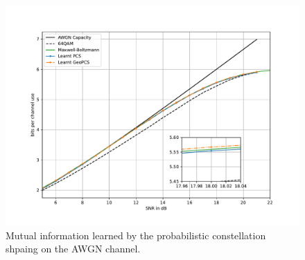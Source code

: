 \begin{figure}[h]
	\includegraphics[width=\columnwidth]{figs/aref_gcs.pdf}
	\caption{Mutual information learned by the probabilistic constellation shpaing on the AWGN channel.}
	\label{fig:arefPerf}
\end{figure}





